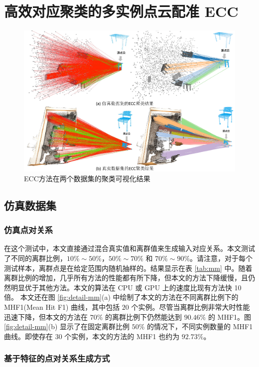 \section{高效对应聚类的多实例点云配准 ECC}
\begin{figure}[ht]
        \centering  
        \includegraphics[width=0.75\linewidth]{images/ECC_cluster.pdf}
        \caption{ECC方法在两个数据集的聚类可视化结果}
        \label{fig:ECC_cluster}
\end{figure}

\subsection{仿真数据集}
\subsubsection{仿真点对关系}
在这个测试中，本文直接通过混合真实值和离群值来生成输入对应关系。本文测试了不同的离群比例，$10\%\sim50\%$，$50\%\sim70\%$ 和 $70\%\sim90\%$。请注意，对于每个测试样本，离群点是在给定范围内随机抽样的。结果显示在表 \ref{tab:mm} 中。随着离群比例的增加，几乎所有方法的性能都有所下降，但本文的方法下降缓慢，且仍然明显优于其他方法。本文的算法在 CPU 或 GPU 上的速度比现有方法快 10 倍。
本文还在图 \ref{fig:detail-mm}(a) 中绘制了本文的方法在不同离群比例下的 MHF1(Mean Hit F1) 曲线，其中包括 $20$ 个实例。尽管当离群比例非常大时性能迅速下降，但本文的方法在 $70\%$ 的离群比例下仍然能达到 $90.46\%$ 的 MHF1。图 \ref{fig:detail-mm}(b) 显示了在固定离群比例 $50\%$ 的情况下，不同实例数量的 MHF1 曲线。即使存在 $30$ 个实例，本文的方法的 MHF1 也约为 $92.73\%$。

\subsubsection{基于特征的点对关系生成方式}

